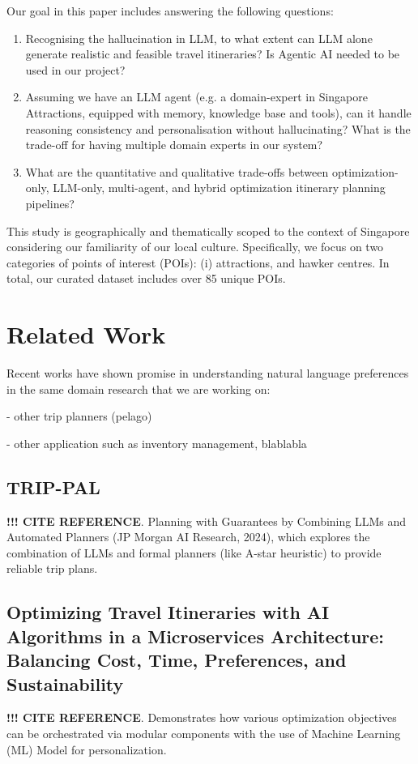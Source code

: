 \documentclass{ecai}
\begin{document}
Our goal in this paper includes answering the following questions: 
\begin{enumerate}
    \item Recognising the hallucination in LLM, to what extent can LLM alone generate realistic and feasible travel itineraries? Is Agentic AI needed to be used in our project?
    \item Assuming we have an LLM agent (e.g. a domain-expert in Singapore Attractions, equipped with memory, knowledge base and tools), can it handle reasoning consistency and personalisation without hallucinating? What is the trade-off for having multiple domain experts in our system?
    \item What are the quantitative and qualitative trade-offs between optimization-only, LLM-only, multi-agent, and hybrid optimization itinerary planning pipelines?
\end{enumerate}

This study is geographically and thematically scoped to the context of Singapore considering our familiarity of our local culture. Specifically, we focus on two categories of points of interest (POIs): (i) attractions, and hawker centres. In total, our curated dataset includes over 85 unique POIs.


\section{Related Work}
Recent works have shown promise in understanding natural language preferences in the same domain research that we are working on:

- other trip planners (pelago)

- other application such as inventory management, blablabla


\subsection{TRIP-PAL}
\textbf{!!! CITE REFERENCE}. Planning with Guarantees by Combining LLMs and Automated Planners (JP Morgan AI Research, 2024), which explores the combination of LLMs and formal planners (like A-star heuristic) to provide reliable trip plans.

\subsection{Optimizing Travel Itineraries with AI Algorithms in a Microservices Architecture: Balancing Cost, Time, Preferences, and Sustainability}
\textbf{!!! CITE REFERENCE}. Demonstrates how various optimization objectives can be orchestrated via modular components with the use of Machine Learning (ML) Model for personalization.
\end{document}
